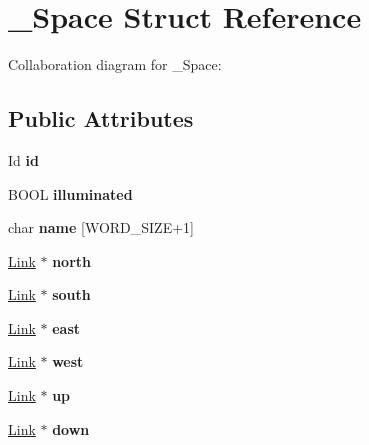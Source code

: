 \hypertarget{struct__Space}{}\section{\+\_\+\+Space Struct Reference}
\label{struct__Space}


Collaboration diagram for \+\_\+\+Space\+:
\subsection*{Public Attributes}
\begin{DoxyCompactItemize}
\item 
\mbox{\label{struct__Space_a70cb461deb9ac073e401b607339b567f}} 
Id {\bfseries id}
\item 
\mbox{\label{struct__Space_a65db5d85a5ce3f7ebb6500f1c820011c}} 
B\+O\+OL {\bfseries illuminated}
\item 
\mbox{\label{struct__Space_aa1c9c994c2d16ecf3ef46138685fdfdc}} 
char {\bfseries name} \mbox{[}W\+O\+R\+D\+\_\+\+S\+I\+ZE+1\mbox{]}
\item 
\mbox{\label{struct__Space_a156a0efd4f35884b90dd3526a4a54b3e}} 
\hyperlink{struct__Link}{Link} $\ast$ {\bfseries north}
\item 
\mbox{\label{struct__Space_a2ada102349bd1c6c81e230b601dc0274}} 
\hyperlink{struct__Link}{Link} $\ast$ {\bfseries south}
\item 
\mbox{\label{struct__Space_a292888fcf317259bd32510bfc3645a21}} 
\hyperlink{struct__Link}{Link} $\ast$ {\bfseries east}
\item 
\mbox{\label{struct__Space_ab52eea5dee1a0c22c0642d4e3ed44e46}} 
\hyperlink{struct__Link}{Link} $\ast$ {\bfseries west}
\item 
\mbox{\label{struct__Space_a930abbdd2402dece70f62daf022e90a3}} 
\hyperlink{struct__Link}{Link} $\ast$ {\bfseries up}
\item 
\mbox{\label{struct__Space_a4e267d349c11840d6db7f9dda3e1160d}} 
\hyperlink{struct__Link}{Link} $\ast$ {\bfseries down}

\end{DoxyCompactItemize}
